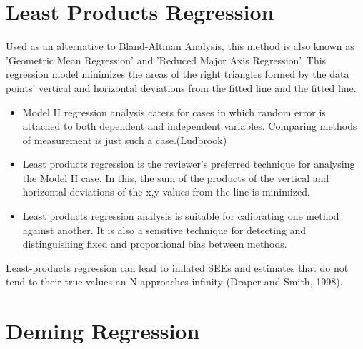 \documentclass[12pt, a4paper]{report}
\theoremstyle{plain}
\theoremstyle{definition}
\theoremstyle{remark}
\begin{document}
\section{Least Products Regression}
Used as an alternative to Bland-Altman Analysis, this method is also known as 'Geometric Mean Regression' and 'Reduced Major Axis Regression'. This regression model minimizes the areas of the right triangles formed by the data points' vertical and horizontal deviations from the fitted line and the fitted line.

\begin{itemize}
	\item Model II regression analysis caters for cases in which random error is attached to both dependent and independent variables. Comparing methods of measurement is just such a case.(Ludbrook)
	
	\item Least products regression is the reviewer's preferred technique for analysing the Model II case. In this, the sum of the products of the vertical and horizontal deviations of the x,y values from the line is minimized.
	
	\item Least products regression analysis is suitable for calibrating one method against another. It is also a sensitive technique for detecting and distinguishing fixed and proportional bias between
	methods.
\end{itemize}

Least-products regression can lead to inflated SEEs and estimates that do not tend to their true values an N approaches infinity (Draper and Smith, 1998).







\section{Deming Regression}
\end{document}
